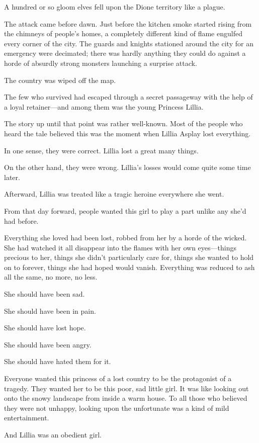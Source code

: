 A hundred or so gloom elves fell upon the Dione territory like a plague.

The attack came before dawn. Just before the kitchen smoke started rising from the chimneys of people’s homes, a completely different kind of flame engulfed every corner of the city. The guards and knights stationed around the city for an emergency were decimated; there was hardly anything they could do against a horde of absurdly strong monsters launching a surprise attack.

The country was wiped off the map.

The few who survived had escaped through a secret passageway with the help of a loyal retainer—and among them was the young Princess Lillia.

The story up until that point was rather well-known. Most of the people who heard the tale believed this was the moment when Lillia Asplay lost everything.

In one sense, they were correct. Lillia lost a great many things.

On the other hand, they were wrong. Lillia’s losses would come quite some time later.

Afterward, Lillia was treated like a tragic heroine everywhere she went.

From that day forward, people wanted this girl to play a part unlike any she’d had before.

Everything she loved had been lost, robbed from her by a horde of the wicked. She had watched it all disappear into the flames with her own eyes—things precious to her, things she didn’t particularly care for, things she wanted to hold on to forever, things she had hoped would vanish. Everything was reduced to ash all the same, no more, no less.

She should have been sad.

She should have been in pain.

She should have lost hope.

She should have been angry.

She should have hated them for it.

Everyone wanted this princess of a lost country to be the protagonist of a tragedy. They wanted her to be this poor, sad little girl. It was like looking out onto the snowy landscape from inside a warm house. To all those who believed they were not unhappy, looking upon the unfortunate was a kind of mild entertainment.

And Lillia was an obedient girl.

